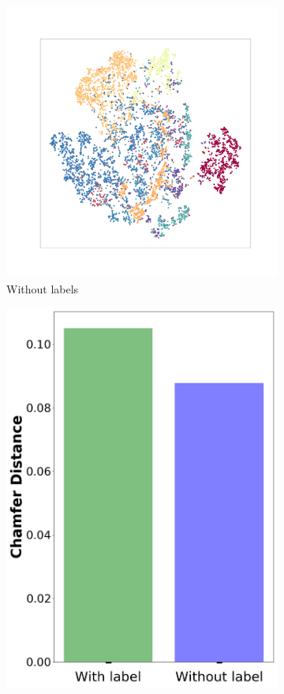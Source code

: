 \documentclass[bachelor, nocolorlinks, printoneside]{seuthesis} %
\begin{document}
\begin{Main}
\begin{figure}
\begin{subfigure}[t]{0.3\linewidth}
    \includegraphics[width=\columnwidth]{figs/T-SNE-noclass.png}
    \caption{Without labels}\label{fig:T-SNE2}
  \end{subfigure}
  \hspace{0.05\linewidth}
  \begin{subfigure}[t]{0.2\linewidth} \centering
    \includegraphics[width=\columnwidth]{figs/label-or-not.png}

\end{subfigure}
\end{figure}
\end{Main}
\end{document}
